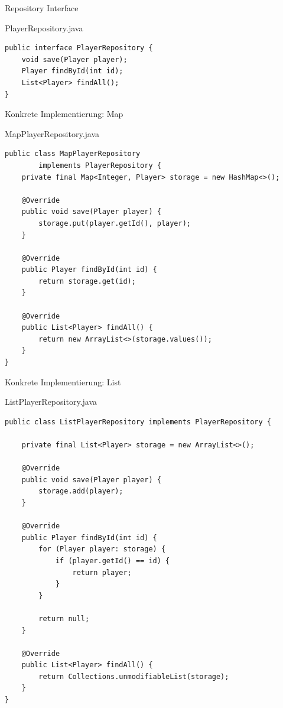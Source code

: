 \begin{frame}[fragile]{Repository Interface}
	\begin{exampleblock}{PlayerRepository.java}
		\begin{lstlisting}
public interface PlayerRepository {
    void save(Player player);
    Player findById(int id);
    List<Player> findAll();
}
		\end{lstlisting}
	\end{exampleblock}
\end{frame}

\begin{frame}[fragile]{Konkrete Implementierung: Map}
	\begin{exampleblock}{MapPlayerRepository.java}
		\begin{lstlisting}[basicstyle=\tiny]
public class MapPlayerRepository 
        implements PlayerRepository {
    private final Map<Integer, Player> storage = new HashMap<>();

    @Override
    public void save(Player player) {
        storage.put(player.getId(), player);
    }

    @Override
    public Player findById(int id) {
        return storage.get(id);
    }

    @Override
    public List<Player> findAll() {
        return new ArrayList<>(storage.values());
    }
}
		\end{lstlisting}
	\end{exampleblock}
\end{frame}

\begin{frame}[fragile]{Konkrete Implementierung: List}
	\begin{exampleblock}{ListPlayerRepository.java}
		\begin{lstlisting}[basicstyle=\tiny]
public class ListPlayerRepository implements PlayerRepository {

	private final List<Player> storage = new ArrayList<>();

	@Override
	public void save(Player player) {
		storage.add(player);
	}

	@Override
	public Player findById(int id) {
		for (Player player: storage) {
			if (player.getId() == id) {
				return player;
			}
		}
		
		return null;
	}

	@Override
	public List<Player> findAll() {
		return Collections.unmodifiableList(storage);
	}
}
		\end{lstlisting}
	\end{exampleblock}
\end{frame}